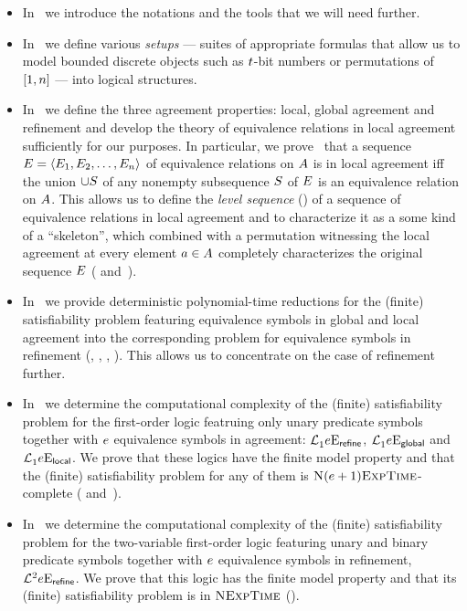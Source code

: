 \begin{itemize}
  \item
  In~ we introduce the notations and the tools that we will
  need further.
  
  \item
  In~ we define various \emph{setups} --- suites of appropriate
  formulas that allow us to model bounded discrete objects such as
  $t$-bit numbers or permutations of $[1,n]$ --- into logical structures.
  
  \item
  In~ we define the three agreement properties: local,
  global agreement and refinement and develop the theory of equivalence
  relations in local agreement sufficiently for our purposes.
  In particular, we prove~ that a sequence $E =
  \left\langle E_{1},E_{2},\dots,E_{n} \right\rangle$ of equivalence relations on $A$ is
  in local agreement iff the union $\cup S$ of any nonempty subsequence $S$
  of $E$ is an equivalence relation on $A$.
  This allows us to define the \emph{level sequence} () of a
  sequence of equivalence relations in local agreement and to characterize it as
  a some kind of a ``skeleton'', which combined with a permutation witnessing
  the local agreement at every element $a\in A$ completely characterizes
  the original sequence $E$ (
  and~).
  
  \item
  In~ we provide deterministic polynomial-time reductions
  for the (finite) satisfiability problem featuring equivalence symbols in
  global and local agreement into the corresponding problem for equivalence
  symbols in refinement (,
  , ,
  ).
  This allows us to concentrate on the case of refinement further.
  
  \item
  In~ we determine the computational complexity of the
  (finite) satisfiability problem for the first-order logic featruing only unary
  predicate symbols together with $e$ equivalence symbols in agreement:
  $\mathcal{L}^{{}}_{1}{e}\mathrm{E}_{\mathsf{refine}}$,
  $\mathcal{L}^{{}}_{1}{e}\mathrm{E}_{\mathsf{global}}$ and 
  $\mathcal{L}^{{}}_{1}{e}\mathrm{E}_{\mathsf{local}}$.
  We prove that these logics have the finite model property and that the
  (finite) satisfiability problem for any of them is
  $\text{\normalfont{\scshape N}}(e+1)\text{\normalfont{\scshape ExpTime}}$-complete (
  and~).
  
  \item
  In~ we determine the computational complexity of the (finite)
  satisfiability problem for the two-variable first-order logic featuring unary
  and binary predicate symbols together with $e$ equivalence symbols in
  refinement,
  $\mathcal{L}^{2}_{{}}{e}\mathrm{E}_{\mathsf{refine}}$.
  We prove that this logic has the finite model property and that its (finite)
  satisfiability problem is in $\text{\normalfont{\scshape NExpTime}}$ ().
\end{itemize}

